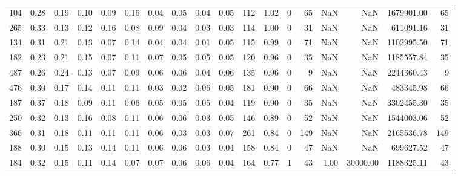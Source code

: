 \begin{tabular}{rrrrrrrrrrllrrrrrr}
          104 & 0.28 & 0.19 & 0.10 & 0.09 & 0.16 & 0.04 & 0.05 & 0.04 & 0.05 & 112 &  1.02 &                  0 &        65 &             NaN &                 NaN &    1679901.00 &                    65 \\
          265 & 0.33 & 0.13 & 0.12 & 0.16 & 0.08 & 0.09 & 0.04 & 0.03 & 0.03 & 114 &  1.00 &                  0 &        31 &             NaN &                 NaN &     611091.16 &                    31 \\
          134 & 0.31 & 0.21 & 0.13 & 0.07 & 0.14 & 0.04 & 0.04 & 0.01 & 0.05 & 115 &  0.99 &                  0 &        71 &             NaN &                 NaN &    1102995.50 &                    71 \\
          182 & 0.23 & 0.21 & 0.15 & 0.07 & 0.11 & 0.07 & 0.05 & 0.05 & 0.05 & 120 &  0.96 &                  0 &        35 &             NaN &                 NaN &    1185557.84 &                    35 \\
          487 & 0.26 & 0.24 & 0.13 & 0.07 & 0.09 & 0.06 & 0.06 & 0.04 & 0.06 & 135 &  0.96 &                  0 &         9 &             NaN &                 NaN &    2244360.43 &                     9 \\
          476 & 0.30 & 0.17 & 0.14 & 0.11 & 0.11 & 0.03 & 0.02 & 0.06 & 0.05 & 181 &  0.90 &                  0 &        66 &             NaN &                 NaN &     483345.98 &                    66 \\
          187 & 0.37 & 0.18 & 0.09 & 0.11 & 0.06 & 0.05 & 0.05 & 0.05 & 0.04 & 119 &  0.90 &                  0 &        35 &             NaN &                 NaN &    3302455.30 &                    35 \\
          250 & 0.32 & 0.13 & 0.16 & 0.08 & 0.11 & 0.06 & 0.06 & 0.03 & 0.05 & 146 &  0.89 &                  0 &        52 &             NaN &                 NaN &    1544003.06 &                    52 \\
          366 & 0.31 & 0.18 & 0.11 & 0.11 & 0.11 & 0.06 & 0.03 & 0.03 & 0.07 & 261 &  0.84 &                  0 &       149 &             NaN &                 NaN &    2165536.78 &                   149 \\
          188 & 0.30 & 0.15 & 0.13 & 0.14 & 0.11 & 0.06 & 0.06 & 0.03 & 0.04 & 158 &  0.84 &                  0 &        47 &             NaN &                 NaN &     699627.52 &                    47 \\
          184 & 0.32 & 0.15 & 0.11 & 0.14 & 0.07 & 0.07 & 0.06 & 0.06 & 0.04 & 164 &  0.77 &                  1 &        43 &            1.00 &            30000.00 &    1188325.11 &                    43 \\

\end{tabular}
